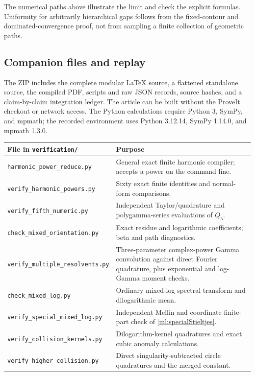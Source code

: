 \documentclass[11pt]{article}
\numberwithin{equation}{section}
\theoremstyle{plain}
\theoremstyle{definition}
\theoremstyle{remark}
\newcommand{\src}[1]{\texttt{\small\nolinkurl{#1}}}
\begin{document}
The numerical paths above illustrate the limit and check the explicit
formulas. Uniformity for arbitrarily hierarchical gaps follows from
the fixed-contour and dominated-convergence proof, not from sampling
a finite collection of geometric paths.

\subsection{Companion files and replay}

The ZIP includes the complete modular \LaTeX{} source, a flattened
standalone source, the compiled PDF, scripts and raw JSON records,
source hashes, and a claim-by-claim integration ledger.
The article can be built without the ProveIt checkout or network access.
The Python calculations require Python 3, SymPy, and mpmath; the recorded
environment uses Python 3.12.14, SymPy 1.14.0, and mpmath 1.3.0.

\begin{longtable}{>{\raggedright\arraybackslash}p{}
                  >{\raggedright\arraybackslash}p{}}
\toprule
File in \src{verification/} & Purpose\\
\midrule
\endhead
\src{harmonic_power_reduce.py} &
General exact finite harmonic compiler; accepts a power on the command line.\\[4pt]
\src{verify_harmonic_powers.py} &
Sixty exact finite identities and normal-form comparisons.\\[4pt]
\src{verify_fifth_numeric.py} &
Independent Taylor/quadrature and polygamma-series evaluations of $Q_5$.\\[4pt]
\src{check_mixed_orientation.py} &
Exact residue and logarithmic coefficients; beta and path diagnostics.\\[4pt]
\src{verify_multiple_resolvents.py} &
Three-parameter complex-power Gamma convolution against direct Fourier
quadrature, plus exponential and log-Gamma moment checks.\\[4pt]
\src{check_mixed_log.py} &
Ordinary mixed-log spectral transform and dilogarithmic mean.\\[4pt]
\src{verify_special_mixed_log.py} &
Independent Mellin and coordinate finite-part check of
\eqref{ml:specialStieltjes}.\\[4pt]
\src{verify_collision_kernels.py} &
Dilogarithm-kernel quadratures and exact cubic anomaly calculations.\\[4pt]
\src{verify_higher_collision.py} &
Direct singularity-subtracted circle quadratures and the merged constant.\\
\bottomrule
\end{longtable}
\end{document}
